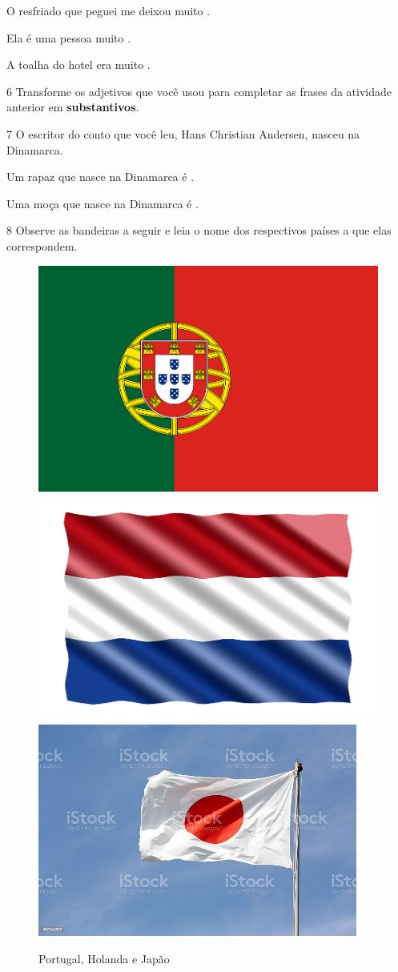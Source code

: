 \begin{escolha}
\item O resfriado que peguei me deixou muito .

\item Ela é uma pessoa muito .

\item A toalha do hotel era muito .
\end{escolha}

\num{6} Transforme os adjetivos que você usou para completar as frases
da atividade anterior em \textbf{substantivos}.




\num{7} O escritor do conto que você leu, Hans Christian Andersen, nasceu na Dinamarca.

\begin{escolha}
\item Um rapaz que nasce na Dinamarca é .

\item Uma moça que nasce na Dinamarca é .
\end{escolha}\enlargethispage{\baselineskip}

\num{8} Observe as bandeiras a seguir e leia o nome dos respectivos países a que elas correspondem.

\begin{figure}[htpb!]
\includegraphics[width=.3\textwidth]{media/image3.png}
\includegraphics[width=.3\textwidth]{media/image4.png}
\includegraphics[width=.3\textwidth]{media/image5.jpeg}
\caption{Portugal, Holanda e Japão}
\end{figure}

